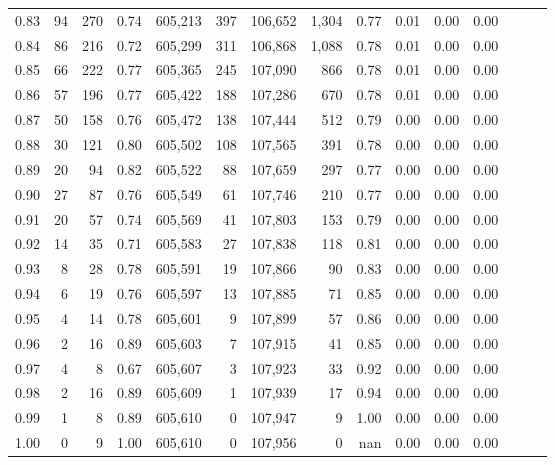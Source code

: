 \begin{tabular}{rrrrrrrrrrrrrrr}
0.83 &      94 &    270 &  0.74 &  605,213 &      397 &  106,652 &    1,304 &  0.77 &  0.01 &  0.00 &      0.00 \\
0.84 &      86 &    216 &  0.72 &  605,299 &      311 &  106,868 &    1,088 &  0.78 &  0.01 &  0.00 &      0.00 \\
0.85 &      66 &    222 &  0.77 &  605,365 &      245 &  107,090 &      866 &  0.78 &  0.01 &  0.00 &      0.00 \\
0.86 &      57 &    196 &  0.77 &  605,422 &      188 &  107,286 &      670 &  0.78 &  0.01 &  0.00 &      0.00 \\
0.87 &      50 &    158 &  0.76 &  605,472 &      138 &  107,444 &      512 &  0.79 &  0.00 &  0.00 &      0.00 \\
0.88 &      30 &    121 &  0.80 &  605,502 &      108 &  107,565 &      391 &  0.78 &  0.00 &  0.00 &      0.00 \\
0.89 &      20 &     94 &  0.82 &  605,522 &       88 &  107,659 &      297 &  0.77 &  0.00 &  0.00 &      0.00 \\
0.90 &      27 &     87 &  0.76 &  605,549 &       61 &  107,746 &      210 &  0.77 &  0.00 &  0.00 &      0.00 \\
0.91 &      20 &     57 &  0.74 &  605,569 &       41 &  107,803 &      153 &  0.79 &  0.00 &  0.00 &      0.00 \\
0.92 &      14 &     35 &  0.71 &  605,583 &       27 &  107,838 &      118 &  0.81 &  0.00 &  0.00 &      0.00 \\
0.93 &       8 &     28 &  0.78 &  605,591 &       19 &  107,866 &       90 &  0.83 &  0.00 &  0.00 &      0.00 \\
0.94 &       6 &     19 &  0.76 &  605,597 &       13 &  107,885 &       71 &  0.85 &  0.00 &  0.00 &      0.00 \\
0.95 &       4 &     14 &  0.78 &  605,601 &        9 &  107,899 &       57 &  0.86 &  0.00 &  0.00 &      0.00 \\
0.96 &       2 &     16 &  0.89 &  605,603 &        7 &  107,915 &       41 &  0.85 &  0.00 &  0.00 &      0.00 \\
0.97 &       4 &      8 &  0.67 &  605,607 &        3 &  107,923 &       33 &  0.92 &  0.00 &  0.00 &      0.00 \\
0.98 &       2 &     16 &  0.89 &  605,609 &        1 &  107,939 &       17 &  0.94 &  0.00 &  0.00 &      0.00 \\
0.99 &       1 &      8 &  0.89 &  605,610 &        0 &  107,947 &        9 &  1.00 &  0.00 &  0.00 &      0.00 \\
1.00 &       0 &      9 &  1.00 &  605,610 &        0 &  107,956 &        0 &   nan &  0.00 &  0.00 &      0.00 \\
\bottomrule
\end{tabular}
